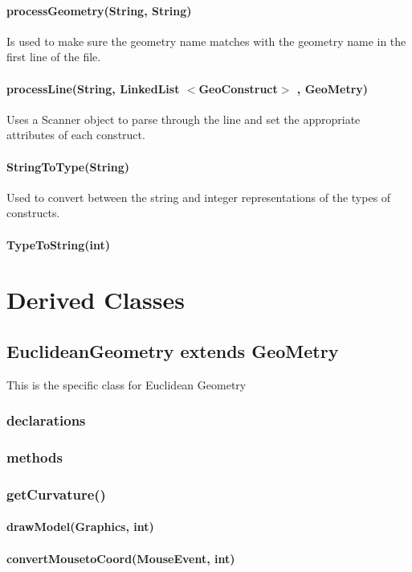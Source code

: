 \documentclass[a4paper,10pt]{report}
\begin{document}
\subsubsection{processGeometry(String, String)} Is used to make sure the geometry name matches with the geometry name in the first line of the file.
\subsubsection{processLine(String, LinkedList $<$GeoConstruct$>$ , GeoMetry)} Uses a Scanner object to parse through the line and set the appropriate attributes of each construct.
\subsubsection{StringToType(String)} Used to convert between the string and integer representations of the types of constructs.
\subsubsection{TypeToString(int)}

\chapter{Derived Classes}
\section{EuclideanGeometry extends GeoMetry} This is the specific class for Euclidean Geometry
\subsection{declarations}
\subsubsection{}
\subsection{methods}
\subsection{getCurvature()} 
\subsubsection{drawModel(Graphics, int)} 
\subsubsection{convertMousetoCoord(MouseEvent, int)} 
\end{document}
